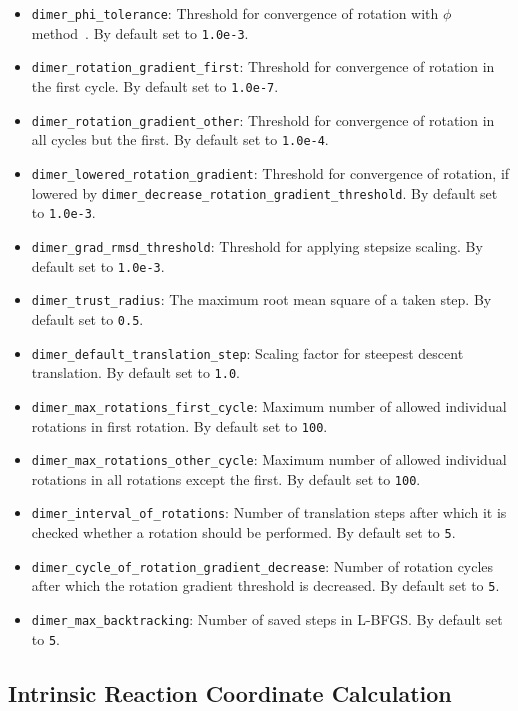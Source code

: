 \documentclass[]{tufte-book}
\begin{document}
\begin{itemize}
\item \texttt{dimer\_phi\_tolerance}: Threshold for convergence of rotation with $\phi$ method~\cite{dimer2}. By default set to \texttt{1.0e-3}.
\item \texttt{dimer\_rotation\_gradient\_first}: Threshold for convergence of rotation in the first cycle. By default set to \texttt{1.0e-7}.
\item \texttt{dimer\_rotation\_gradient\_other}: Threshold for convergence of rotation in all cycles but the first. By default set to \texttt{1.0e-4}.
\item \texttt{dimer\_lowered\_rotation\_gradient}: Threshold for convergence of rotation, if lowered by \texttt{dimer\_decrease\_rotation\_gradient\_threshold}. By default set to \texttt{1.0e-3}.
\item \texttt{dimer\_grad\_rmsd\_threshold}: Threshold for applying stepsize scaling. By default set to \texttt{1.0e-3}.
\item \texttt{dimer\_trust\_radius}: The maximum root mean square of a taken step. By default set to \texttt{0.5}.
\item \texttt{dimer\_default\_translation\_step}: Scaling factor for steepest descent translation. By default set to \texttt{1.0}.
\item \texttt{dimer\_max\_rotations\_first\_cycle}: Maximum number of allowed individual rotations in first rotation. By default set to \texttt{100}.
\item \texttt{dimer\_max\_rotations\_other\_cycle}: Maximum number of allowed individual rotations in all rotations except the first. By default set to \texttt{100}.
\item \texttt{dimer\_interval\_of\_rotations}: Number of translation steps after which it is checked whether a rotation should be performed. By default set to \texttt{5}.
\item \texttt{dimer\_cycle\_of\_rotation\_gradient\_decrease}: Number of rotation cycles after which the rotation gradient threshold is decreased. By default set to \texttt{5}.
\item \texttt{dimer\_max\_backtracking}: Number of saved steps in L-BFGS. By default set to \texttt{5}.
\end{itemize}

\subsection{Intrinsic Reaction Coordinate Calculation}
\end{document}
